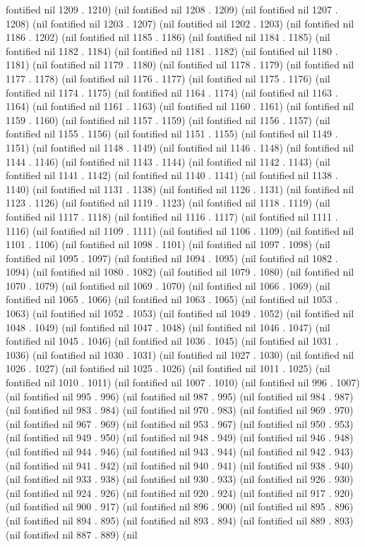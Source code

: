 fontified nil 1209 . 1210) (nil fontified nil 1208 . 1209) (nil fontified nil 1207 . 1208) (nil fontified nil 1203 . 1207) (nil fontified nil 1202 . 1203) (nil fontified nil 1186 . 1202) (nil fontified nil 1185 . 1186) (nil fontified nil 1184 . 1185) (nil fontified nil 1182 . 1184) (nil fontified nil 1181 . 1182) (nil fontified nil 1180 . 1181) (nil fontified nil 1179 . 1180) (nil fontified nil 1178 . 1179) (nil fontified nil 1177 . 1178) (nil fontified nil 1176 . 1177) (nil fontified nil 1175 . 1176) (nil fontified nil 1174 . 1175) (nil fontified nil 1164 . 1174) (nil fontified nil 1163 . 1164) (nil fontified nil 1161 . 1163) (nil fontified nil 1160 . 1161) (nil fontified nil 1159 . 1160) (nil fontified nil 1157 . 1159) (nil fontified nil 1156 . 1157) (nil fontified nil 1155 . 1156) (nil fontified nil 1151 . 1155) (nil fontified nil 1149 . 1151) (nil fontified nil 1148 . 1149) (nil fontified nil 1146 . 1148) (nil fontified nil 1144 . 1146) (nil fontified nil 1143 . 1144) (nil fontified nil 1142 . 1143) (nil fontified nil 1141 . 1142) (nil fontified nil 1140 . 1141) (nil fontified nil 1138 . 1140) (nil fontified nil 1131 . 1138) (nil fontified nil 1126 . 1131) (nil fontified nil 1123 . 1126) (nil fontified nil 1119 . 1123) (nil fontified nil 1118 . 1119) (nil fontified nil 1117 . 1118) (nil fontified nil 1116 . 1117) (nil fontified nil 1111 . 1116) (nil fontified nil 1109 . 1111) (nil fontified nil 1106 . 1109) (nil fontified nil 1101 . 1106) (nil fontified nil 1098 . 1101) (nil fontified nil 1097 . 1098) (nil fontified nil 1095 . 1097) (nil fontified nil 1094 . 1095) (nil fontified nil 1082 . 1094) (nil fontified nil 1080 . 1082) (nil fontified nil 1079 . 1080) (nil fontified nil 1070 . 1079) (nil fontified nil 1069 . 1070) (nil fontified nil 1066 . 1069) (nil fontified nil 1065 . 1066) (nil fontified nil 1063 . 1065) (nil fontified nil 1053 . 1063) (nil fontified nil 1052 . 1053) (nil fontified nil 1049 . 1052) (nil fontified nil 1048 . 1049) (nil fontified nil 1047 . 1048) (nil fontified nil 1046 . 1047) (nil fontified nil 1045 . 1046) (nil fontified nil 1036 . 1045) (nil fontified nil 1031 . 1036) (nil fontified nil 1030 . 1031) (nil fontified nil 1027 . 1030) (nil fontified nil 1026 . 1027) (nil fontified nil 1025 . 1026) (nil fontified nil 1011 . 1025) (nil fontified nil 1010 . 1011) (nil fontified nil 1007 . 1010) (nil fontified nil 996 . 1007) (nil fontified nil 995 . 996) (nil fontified nil 987 . 995) (nil fontified nil 984 . 987) (nil fontified nil 983 . 984) (nil fontified nil 970 . 983) (nil fontified nil 969 . 970) (nil fontified nil 967 . 969) (nil fontified nil 953 . 967) (nil fontified nil 950 . 953) (nil fontified nil 949 . 950) (nil fontified nil 948 . 949) (nil fontified nil 946 . 948) (nil fontified nil 944 . 946) (nil fontified nil 943 . 944) (nil fontified nil 942 . 943) (nil fontified nil 941 . 942) (nil fontified nil 940 . 941) (nil fontified nil 938 . 940) (nil fontified nil 933 . 938) (nil fontified nil 930 . 933) (nil fontified nil 926 . 930) (nil fontified nil 924 . 926) (nil fontified nil 920 . 924) (nil fontified nil 917 . 920) (nil fontified nil 900 . 917) (nil fontified nil 896 . 900) (nil fontified nil 895 . 896) (nil fontified nil 894 . 895) (nil fontified nil 893 . 894) (nil fontified nil 889 . 893) (nil fontified nil 887 . 889) (nil 